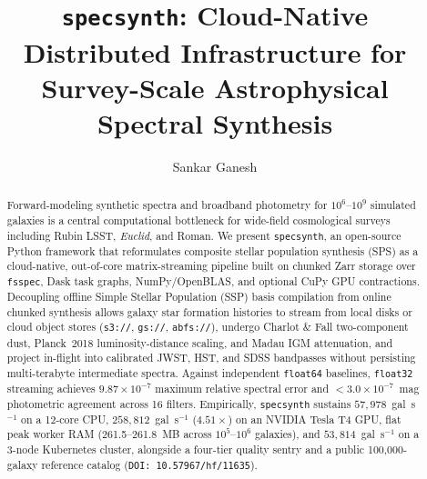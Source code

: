 \documentclass[preprint,12pt,authoryear]{elsarticle}
\begin{document}
\begin{frontmatter}

\title{\texttt{specsynth}: Cloud-Native Distributed Infrastructure for Survey-Scale Astrophysical Spectral Synthesis}

\author[1]{Sankar Ganesh}


\begin{abstract}
Forward-modeling synthetic spectra and broadband photometry for $10^6$--$10^9$ simulated galaxies is a central computational bottleneck for wide-field cosmological surveys including Rubin LSST, \textit{Euclid}, and Roman. We present \texttt{specsynth}, an open-source Python framework that reformulates composite stellar population synthesis (SPS) as a cloud-native, out-of-core matrix-streaming pipeline built on chunked Zarr storage over \texttt{fsspec}, Dask task graphs, NumPy/OpenBLAS, and optional CuPy GPU contractions. Decoupling offline Simple Stellar Population (SSP) basis compilation from online chunked synthesis allows galaxy star formation histories to stream from local disks or cloud object stores (\texttt{s3://}, \texttt{gs://}, \texttt{abfs://}), undergo Charlot \& Fall two-component dust, Planck~2018 luminosity-distance scaling, and Madau IGM attenuation, and project in-flight into calibrated JWST, HST, and SDSS bandpasses without persisting multi-terabyte intermediate spectra. Against independent \texttt{float64} baselines, \texttt{float32} streaming achieves $9.87\times 10^{-7}$ maximum relative spectral error and $<3.0\times 10^{-7}$~mag photometric agreement across 16 filters. Empirically, \texttt{specsynth} sustains $57{,}978$~gal~s$^{-1}$ on a 12-core CPU, $258{,}812$~gal~s$^{-1}$ ($4.51\times$) on an NVIDIA Tesla T4 GPU, flat peak worker RAM (261.5--261.8~MB across $10^5$--$10^6$ galaxies), and $53{,}814$~gal~s$^{-1}$ on a 3-node Kubernetes cluster, alongside a four-tier quality sentry and a public 100,000-galaxy reference catalog (\texttt{DOI: 10.57967/hf/11635}).
\end{abstract}



\end{frontmatter}
\end{document}
